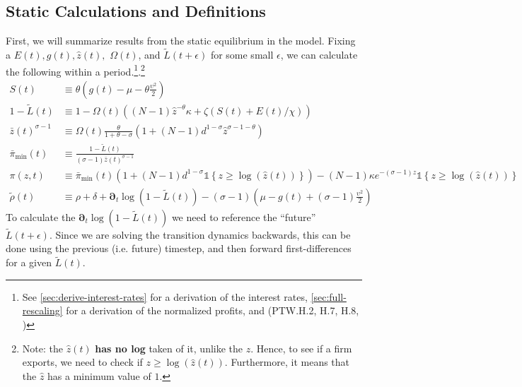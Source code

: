 \documentclass[11pt]{article}
\newcommand{\D}[1][]{\ensuremath{\boldsymbol{\partial}_{#1}}}
\newcommand{\indicator}[1]{\ensuremath{\mathds{1}\left\{{#1}\right\}}}
\begin{document}
\subsection{Static Calculations and Definitions}
First, we will summarize results from the static equilibrium in the model.  Fixing a $E(t), g(t), \hat{z}(t),$ $\Omega(t)$, and $\tilde{L}(t+\epsilon)$ for some small $\epsilon$, we can calculate the following within a period.\footnote{See \cref{sec:derive-interest-rates} for a derivation of the interest rates, \cref{sec:full-rescaling} for a derivation of the normalized profits, and (PTW.H.2, H.7, H.8, )}.\footnote{Note: the $\hat{z}(t)$ \textbf{has no log} taken of it, unlike the $z$.  Hence, to see if a firm exports, we need to check if $z \geq \log(\hat{z}(t))$.  Furthermore, it means that the $\hat{z}$ has a minimum value of $1$.}  
\begin{align}
	S(t) &\equiv \theta \left( g(t) - \mu - \theta\frac{\upsilon^2}{2}\right)\\
	1 - \tilde{L}(t) &\equiv 1 - \Omega(t)\left((N -1)\hat{z}^{-\theta}\kappa + \zeta \left(S(t) + E(t)/\chi \right)\right)\\
	\bar{z}(t)^{\sigma - 1}&\equiv \Omega(t)
\frac{\theta}{1+\theta - \sigma}\left(1 + (N-1)d^{1-\sigma}\hat{z}^{\sigma - 1 -\theta} \right)\\
	\bar{\pi}_{\min}(t) &\equiv \frac{1-\tilde{L}(t)}{(\sigma-1)\bar{z}(t)^{\sigma-1}}\\
	\pi(z,t) &\equiv \bar{\pi}_{\min}(t)\left(1 + (N-1)d^{1-\sigma}\indicator{z \geq \log(\hat{z}(t))}\right) - (N-1)\kappa e^{-(\sigma - 1)z}\indicator{z \geq \log(\hat{z}(t))}\\
	\tilde{\rho}(t) &\equiv \rho+ \delta + \D[t]\log\left(1 - \tilde{L}(t)\right) - (\sigma - 1)\left(\mu - g(t) + (\sigma - 1)\frac{\upsilon^2}{2} \right)
\end{align}
To calculate the $\D[t]\log\left(1 - \tilde{L}(t)\right)$ we need to reference the ``future'' $\tilde{L}(t+\epsilon)$.  Since we are solving the transition dynamics backwards, this can be done using the previous (i.e. future) timestep, and then forward first-differences for a given $\tilde{L}(t)$.
\end{document}
